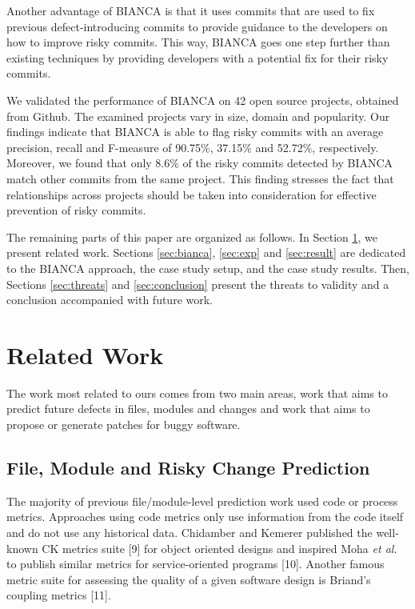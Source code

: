 \documentclass[conference]{IEEEtran}
\begin{document}
Another advantage of BIANCA is that it uses commits that are used to fix
previous defect-introducing commits to provide guidance to the
developers on how to improve risky commits. This way, BIANCA goes one
step further than existing techniques by providing developers with a
potential fix for their risky commits.

We validated the performance of BIANCA on 42 open source projects,
obtained from Github. The examined projects vary in size, domain and
popularity. Our findings indicate that BIANCA is able to flag risky
commits with an average precision, recall and F-measure of 90.75\%,
37.15\% and 52.72\%, respectively. Moreover, we found that only 8.6\% of
the risky commits detected by BIANCA match other commits from the same
project. This finding stresses the fact that relationships across
projects should be taken into consideration for effective prevention of
risky commits.

The remaining parts of this paper are organized as follows. In Section
\ref{sec:relwork}, we present related work. Sections \ref{sec:bianca},
\ref{sec:exp} and \ref{sec:result} are dedicated to the BIANCA approach,
the case study setup, and the case study results. Then, Sections
\ref{sec:threats} and \ref{sec:conclusion} present the threats to
validity and a conclusion accompanied with future work.

\section{Related Work}\label{sec:relwork}

The work most related to ours comes from two main areas, work that aims
to predict future defects in files, modules and changes and work that
aims to propose or generate patches for buggy software.

\subsection{File, Module and Risky Change
Prediction}\label{file-module-and-risky-change-prediction}

The majority of previous file/module-level prediction work used code or
process metrics. Approaches using code metrics only use information from
the code itself and do not use any historical data. Chidamber and
Kemerer published the well-known CK metrics suite {[}9{]} for object
oriented designs and inspired Moha \emph{et al.} to publish similar
metrics for service-oriented programs {[}10{]}. Another famous metric
suite for assessing the quality of a given software design is Briand's
coupling metrics {[}11{]}.
\end{document}
